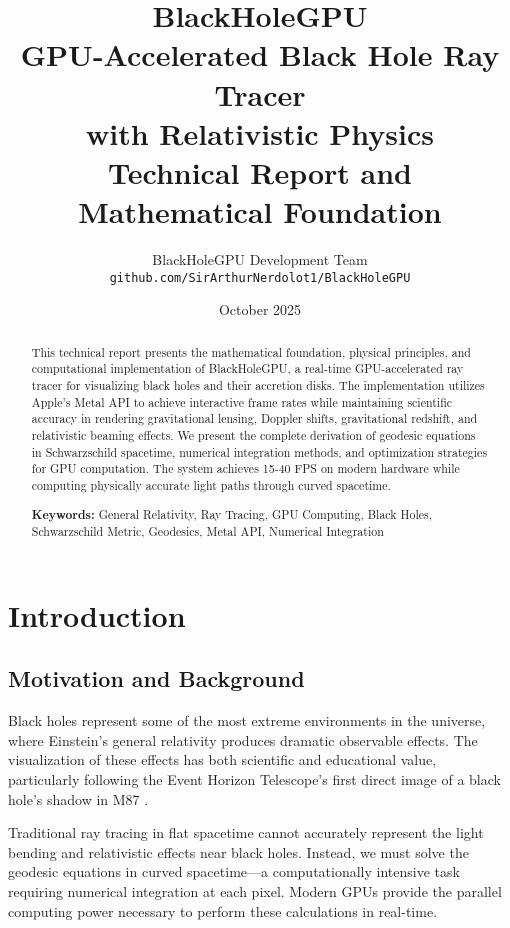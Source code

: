 \documentclass[12pt,a4paper]{article}
\title{
    \Huge \textbf{BlackHoleGPU}\\
    \Large GPU-Accelerated Black Hole Ray Tracer\\
    with Relativistic Physics\\
    \vspace{1cm}
    \large Technical Report and Mathematical Foundation
}
\author{
    BlackHoleGPU Development Team\\
    \texttt{github.com/SirArthurNerdolot1/BlackHoleGPU}
}
\date{October 2025}
\theoremstyle{definition}
\theoremstyle{remark}
\begin{document}
\maketitle

\begin{abstract}
This technical report presents the mathematical foundation, physical principles, and computational implementation of BlackHoleGPU, a real-time GPU-accelerated ray tracer for visualizing black holes and their accretion disks. The implementation utilizes Apple's Metal API to achieve interactive frame rates while maintaining scientific accuracy in rendering gravitational lensing, Doppler shifts, gravitational redshift, and relativistic beaming effects. We present the complete derivation of geodesic equations in Schwarzschild spacetime, numerical integration methods, and optimization strategies for GPU computation. The system achieves 15-40 FPS on modern hardware while computing physically accurate light paths through curved spacetime.

\textbf{Keywords:} General Relativity, Ray Tracing, GPU Computing, Black Holes, Schwarzschild Metric, Geodesics, Metal API, Numerical Integration
\end{abstract}

\clearpage
\tableofcontents
\clearpage

\section{Introduction}

\subsection{Motivation and Background}

Black holes represent some of the most extreme environments in the universe, where Einstein's general relativity produces dramatic observable effects. The visualization of these effects has both scientific and educational value, particularly following the Event Horizon Telescope's first direct image of a black hole's shadow in M87 \cite{EHT2019}.

Traditional ray tracing in flat spacetime cannot accurately represent the light bending and relativistic effects near black holes. Instead, we must solve the geodesic equations in curved spacetime—a computationally intensive task requiring numerical integration at each pixel. Modern GPUs provide the parallel computing power necessary to perform these calculations in real-time.
\end{document}
